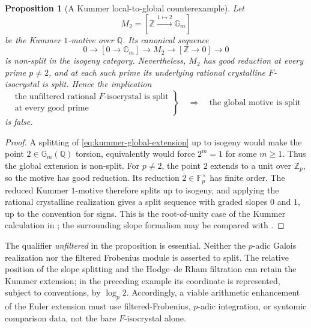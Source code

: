 \documentclass[11pt]{article}
\newtheorem{proposition}[theorem]{Proposition}
\theoremstyle{definition}
\theoremstyle{remark}
\begin{document}
\begin{proposition}[A Kummer local-to-global counterexample]
\label{prop:kummer-bare-frobenius-counterexample}
Let
\[
 M_2=[\mathbb Z\xrightarrow{1\mapsto2}\mathbb G_m]
\]
be the Kummer $1$-motive over $\mathbb Q$.  Its canonical sequence
\begin{equation}\label{eq:kummer-global-extension}
 0\longrightarrow[0\to\mathbb G_m]
 \longrightarrow M_2
 \longrightarrow[\mathbb Z\to0]
 \longrightarrow0
\end{equation}
is non-split in the isogeny category.  Nevertheless, $M_2$ has good
reduction at every prime $p\ne2$, and at each such prime its underlying
rational crystalline $F$-isocrystal is split.  Hence the implication
\[
 \left.
 \begin{array}{c}
 \text{the unfiltered rational $F$-isocrystal is split}\\
 \text{at every good prime}
 \end{array}
 \right\}
 \quad\Longrightarrow\quad
 \text{the global motive is split}
\]
is false.
\end{proposition}

\begin{proof}
A splitting of \eqref{eq:kummer-global-extension} up to isogeny would make
the point $2\in\mathbb G_m(\mathbb Q)$ torsion, equivalently would force
$2^m=1$ for some $m\ge1$.  Thus the global extension is non-split.  For
$p\ne2$, the point $2$ extends to a unit over $\mathbb Z_p$, so the motive
has good reduction.  Its reduction $\overline{2}\in\mathbb F_p^\times$ has
finite order.  The reduced Kummer $1$-motive therefore splits up to
isogeny, and applying the rational crystalline realization gives a split
sequence with graded slopes $0$ and $1$, up to the convention for signs.
This is the root-of-unity case of the Kummer calculation in
\cite[Example~6.3]{MohajerSebbar2025}; the surrounding slope formalism may be
compared with \cite{KedlayaIsocrystals}.
\end{proof}

The qualifier \emph{unfiltered} in the proposition is essential.  Neither
the $p$-adic Galois realization nor the filtered Frobenius module is asserted
to split.  The relative position of the slope splitting and the Hodge--de
Rham filtration can retain the Kummer extension; in the preceding example
its coordinate is represented, subject to conventions, by $\log_p2$.
Accordingly, a viable arithmetic enhancement of the Euler extension must
use filtered-Frobenius, $p$-adic integration, or syntomic comparison data,
not the bare $F$-isocrystal alone.
\end{document}
